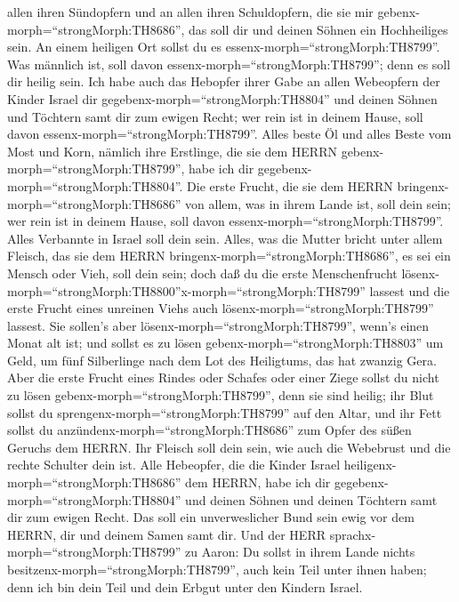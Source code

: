 allen ihren Sündopfern und an allen ihren Schuldopfern, die sie mir
gebenx-morph=``strongMorph:TH8686'', das soll dir und deinen Söhnen ein
Hochheiliges sein.  An einem heiligen Ort sollst du es
essenx-morph=``strongMorph:TH8799''. Was männlich ist, soll davon
essenx-morph=``strongMorph:TH8799''; denn es soll dir heilig sein.
 Ich habe auch das Hebopfer ihrer Gabe an allen Webeopfern
der Kinder Israel dir gegebenx-morph=``strongMorph:TH8804'' und deinen
Söhnen und Töchtern samt dir zum ewigen Recht; wer rein ist in deinem
Hause, soll davon essenx-morph=``strongMorph:TH8799''. 
Alles beste Öl und alles Beste vom Most und Korn, nämlich ihre
Erstlinge, die sie dem HERRN gebenx-morph=``strongMorph:TH8799'', habe
ich dir gegebenx-morph=``strongMorph:TH8804''.  Die erste
Frucht, die sie dem HERRN bringenx-morph=``strongMorph:TH8686'' von
allem, was in ihrem Lande ist, soll dein sein; wer rein ist in deinem
Hause, soll davon essenx-morph=``strongMorph:TH8799''. 
Alles Verbannte in Israel soll dein sein.  Alles, was die
Mutter bricht unter allem Fleisch, das sie dem HERRN
bringenx-morph=``strongMorph:TH8686'', es sei ein Mensch oder Vieh, soll
dein sein; doch daß du die erste Menschenfrucht
lösenx-morph=``strongMorph:TH8800''x-morph=``strongMorph:TH8799''
lassest und die erste Frucht eines unreinen Viehs auch
lösenx-morph=``strongMorph:TH8799'' lassest.  Sie sollen's
aber lösenx-morph=``strongMorph:TH8799'', wenn's einen Monat alt ist;
und sollst es zu lösen gebenx-morph=``strongMorph:TH8803'' um Geld, um
fünf Silberlinge nach dem Lot des Heiligtums, das hat zwanzig Gera.
 Aber die erste Frucht eines Rindes oder Schafes oder einer
Ziege sollst du nicht zu lösen gebenx-morph=``strongMorph:TH8799'', denn
sie sind heilig; ihr Blut sollst du
sprengenx-morph=``strongMorph:TH8799'' auf den Altar, und ihr Fett
sollst du anzündenx-morph=``strongMorph:TH8686'' zum Opfer des süßen
Geruchs dem HERRN.  Ihr Fleisch soll dein sein, wie auch
die Webebrust und die rechte Schulter dein ist.  Alle
Hebeopfer, die die Kinder Israel heiligenx-morph=``strongMorph:TH8686''
dem HERRN, habe ich dir gegebenx-morph=``strongMorph:TH8804'' und deinen
Söhnen und deinen Töchtern samt dir zum ewigen Recht. Das soll ein
unverweslicher Bund sein ewig vor dem HERRN, dir und deinem Samen samt
dir.  Und der HERR sprachx-morph=``strongMorph:TH8799'' zu
Aaron: Du sollst in ihrem Lande nichts
besitzenx-morph=``strongMorph:TH8799'', auch kein Teil unter ihnen
haben; denn ich bin dein Teil und dein Erbgut unter den Kindern Israel.
